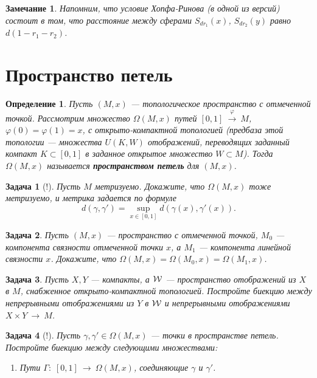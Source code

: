 \documentclass[12pt]{book}
\newcommand{\subs}{\section}
\newcommand{\arrow}{{\:\longrightarrow\:}}
\renewcommand{\phi}{\varphi}
\theoremstyle{upshape}
\newtheorem{zadacha}{Задача}[chapter]
\theoremstyle{generic}
\newtheorem{opredelenie}[teorema]{Определение}
\theoremstyle{upshapenonumber}
\newtheorem{zamechanie}{Замечание}[chapter]
\renewcommand{\labelenumi}{\ralph{enumi}.}
\newcommand{\следствие}{%
     \refstepcounter{teorema}
     {\noindent\bf Следствие \thechapter.\arabic{teorema}:\ }}
\newcommand{\пример}{%
     \refstepcounter{teorema}
     {\noindent\bf Пример \thechapter.\arabic{teorema}:\ }}
\newcommand{\лемма}{%
     \refstepcounter{teorema}
     {\noindent\bf Лемма \thechapter.\arabic{teorema}:\ }}
\newcommand{\теорема}{%
     \refstepcounter{teorema}
     {\noindent\bf Теорема \thechapter.\arabic{teorema}:\ }}
\newcommand{\утверждение}{%
     \refstepcounter{teorema}
     {\noindent\bf Утверждение \thechapter.\arabic{teorema}:\ }}
\begin{document}
{\begin{zamechanie} 
Напомним, что условие Хопфа-Ринова 
(в одной из версий) состоит в том, что
расстояние между сферами $S_{dr_1}(x)$, $S_{dr_2}(y)$
равно $d(1-r_1-r_2)$.  
\end{zamechanie}

\subs{Пространство петель}

\begin{opredelenie}
Пусть $(M, x)$ --- топологическое пространство с отмеченной
точкой. Рассмотрим множество $\Omega(M, x)$ путей
$[0, 1] \stackrel \phi \arrow M$, $\phi(0) = \phi(1) = x$,
с открыто-компактной топологией (предбаза этой топологии --- 
множества $U(K, W)$ отображений, переводящих
заданный компакт $K\subset [0,1]$ в заданное
открытое множество $W\subset M$). 
Тогда $\Omega(M, x)$ называется 
{\bf пространством петель} для $(M,x)$.
\end{opredelenie}

\begin{zadacha}[!]
Пусть $M$ метризуемо. Докажите, что 
$\Omega(M, x)$ тоже метризуемо, и метрика
задается по формуле 
\[ d(\gamma, \gamma') = \sup_{x\in[0,1]}d(\gamma(x),
\gamma'(x)).
\]
\end{zadacha}

\begin{zadacha}
Пусть $(M, x)$ --- пространство с отмеченной точкой,
$M_0$ --- компонента связности отмеченной точки $x$, а $M_1$ --- компонента
линейной связности $x$. Докажите, что
$\Omega(M, x)=\Omega(M_0, x)=\Omega(M_1, x)$.
\end{zadacha}

\begin{zadacha}
Пусть $X, Y$ --- компакты, а $\cal W$  --- пространство
отображений из $X$ в $M$, снабженное открыто-компактной топологией.
Постройте биекцию между непрерывными отображениями
из $Y$ в $\cal W$ и непрерывными отображениями
$X \times Y \arrow M$.
\end{zadacha}


\begin{zadacha}[!]
Пусть $\gamma, \gamma'\in \Omega(M,x)$ --- точки в
пространстве петель. Постройте биекцию между следующими
множествами:
\begin{enumerate}
\renewcommand{\labelenumi}{(\roman{enumi})}
\item Пути $\Gamma:\; [0, 1] \arrow \Omega(M,x)$,
соединяющие $\gamma$ и $\gamma'$.


\end{enumerate}
\end{zadacha}}
\end{document}
